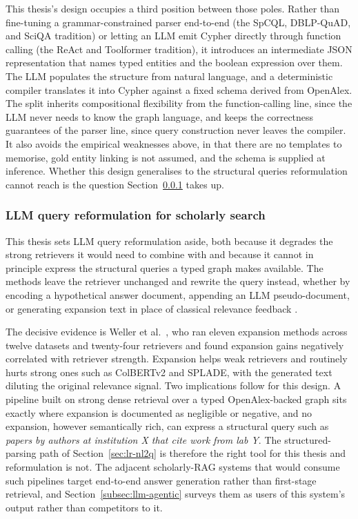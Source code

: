 This thesis's design occupies a third position between those poles.
Rather than fine-tuning a grammar-constrained parser end-to-end (the
SpCQL, DBLP-QuAD, and SciQA tradition) or letting an LLM emit Cypher
directly through function calling (the ReAct and Toolformer tradition),
it introduces an intermediate JSON representation that names typed
entities and the boolean expression over them.  The LLM populates the
structure from natural language, and a deterministic compiler
translates it into Cypher against a fixed schema derived from OpenAlex.
The split inherits compositional flexibility from the function-calling
line, since the LLM never needs to know the graph language, and keeps
the correctness guarantees of the parser line, since query construction
never leaves the compiler.  It also avoids the empirical weaknesses
above, in that there are no templates to memorise, gold entity linking
is not assumed, and the schema is supplied at inference.  Whether this
design generalises to the structural queries reformulation cannot reach
is the question Section~\ref{sec:lr-rag} takes up.

\subsubsection{LLM query reformulation for scholarly search}
\label{sec:lr-rag}

This thesis sets LLM query reformulation aside, both because it
degrades the strong retrievers it would need to combine with and
because it cannot in principle express the structural queries a typed
graph makes available.  The methods leave the retriever unchanged and
rewrite the query instead, whether by encoding a hypothetical answer
document, appending an LLM pseudo-document, or generating expansion
text in place of classical relevance feedback
\cite{gao2023hyde,wang2023query2doc,jagerman2023qexp,mackie2023grf}.

The decisive evidence is Weller et al.\ \cite{weller2024whenfail}, who
ran eleven expansion methods across twelve datasets and twenty-four
retrievers and found expansion gains negatively correlated with
retriever strength.  Expansion helps weak retrievers and routinely
hurts strong ones such as ColBERTv2 and SPLADE, with the generated text
diluting the original relevance signal.  Two implications follow for
this design.  A pipeline built on strong dense retrieval over a typed
OpenAlex-backed graph sits exactly where expansion is documented as
negligible or negative, and no expansion, however semantically rich,
can express a structural query such as \emph{papers by authors at
institution X that cite work from lab Y}.  The structured-parsing path
of Section~\ref{sec:lr-nl2q} is therefore the right tool for this
thesis and reformulation is not.  The adjacent scholarly-RAG systems
that would consume such pipelines target end-to-end answer generation
rather than first-stage retrieval, and
Section~\ref{subsec:llm-agentic} surveys them as users of this system's
output rather than competitors to it.

